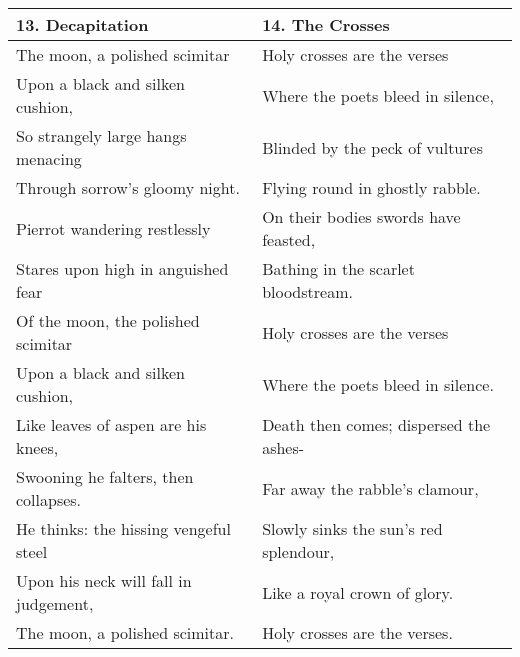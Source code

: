 \newpage
\begin{table}[h!]
\begin{tabular}{p{8.0cm}|p{8.0cm}} \hline

13. Decapitation & 14. The Crosses \\\hline
The moon, a polished scimitar & Holy crosses are the verses \\
Upon a black and silken cushion, & Where the poets bleed in silence, \\
So strangely large hangs menacing & Blinded by the peck of vultures \\
Through sorrow's gloomy night. & Flying round in ghostly rabble. \\
Pierrot wandering restlessly & On their bodies swords have feasted, \\
Stares upon high in anguished fear & Bathing in the scarlet bloodstream. \\
Of the moon, the polished scimitar & Holy crosses are the verses \\
Upon a black and silken cushion, & Where the poets bleed in silence. \\
Like leaves of aspen are his knees, & Death then comes; dispersed the ashes- \\
Swooning he falters, then collapses. & Far away the rabble's clamour, \\
He thinks: the hissing vengeful steel & Slowly sinks the sun's red splendour, \\
Upon his neck will fall in judgement, & Like a royal crown of glory. \\
The moon, a polished scimitar. & Holy crosses are the verses. \\\hline




\end{tabular}
\end{table}

